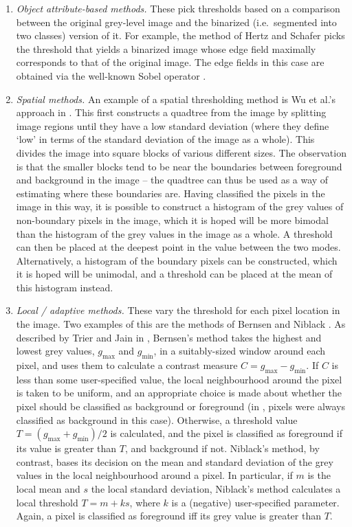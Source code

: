 \begin{enumerate}
\item \emph{Object attribute-based methods.} These pick thresholds based on a comparison between the original grey-level image and the binarized (i.e.~segmented into two classes) version of it. For example, the method of Hertz and Schafer \cite{hertz88} picks the threshold that yields a binarized image whose edge field maximally corresponds to that of the original image. The edge fields in this case are obtained via the well-known Sobel operator \cite{gonzalez02}.

\item \emph{Spatial methods.} An example of a spatial thresholding method is Wu et al.'s approach in \cite{wu82}. This first constructs a quadtree from the image by splitting image regions until they have a low standard deviation (where they define `low' in terms of the standard deviation of the image as a whole). This divides the image into square blocks of various different sizes. The observation is that the smaller blocks tend to be near the boundaries between foreground and background in the image -- the quadtree can thus be used as a way of estimating where these boundaries are. Having classified the pixels in the image in this way, it is possible to construct a histogram of the grey values of non-boundary pixels in the image, which it is hoped will be more bimodal than the histogram of the grey values in the image as a whole. A threshold can then be placed at the deepest point in the value between the two modes. Alternatively, a histogram of the boundary pixels can be constructed, which it is hoped will be unimodal, and a threshold can be placed at the mean of this histogram instead.

\newpage

\item \emph{Local / adaptive methods.} These vary the threshold for each pixel location in the image. Two examples of this are the methods of Bernsen \cite{bernsen86} and Niblack \cite{niblack86}. As described by Trier and Jain in \cite{trier95}, Bernsen's method takes the highest and lowest grey values, $g_{\mbox{max}}$ and $g_{\mbox{min}}$, in a suitably-sized window around each pixel, and uses them to calculate a contrast measure $C = g_{\mbox{max}} - g_{\mbox{min}}$. If $C$ is less than some user-specified value, the local neighbourhood around the pixel is taken to be uniform, and an appropriate choice is made about whether the pixel should be classified as background or foreground (in \cite{trier95}, pixels were always classified as background in this case). Otherwise, a threshold value $T = (g_{\mbox{max}} + g_{\mbox{min}}) / 2$ is calculated, and the pixel is classified as foreground if its value is greater than $T$, and background if not. Niblack's method, by contrast, bases its decision on the mean and standard deviation of the grey values in the local neighbourhood around a pixel. In particular, if $m$ is the local mean and $s$ the local standard deviation, Niblack's method calculates a local threshold $T = m + ks$, where $k$ is a (negative) user-specified parameter. Again, a pixel is classified as foreground iff its grey value is greater than $T$.

\end{enumerate}

